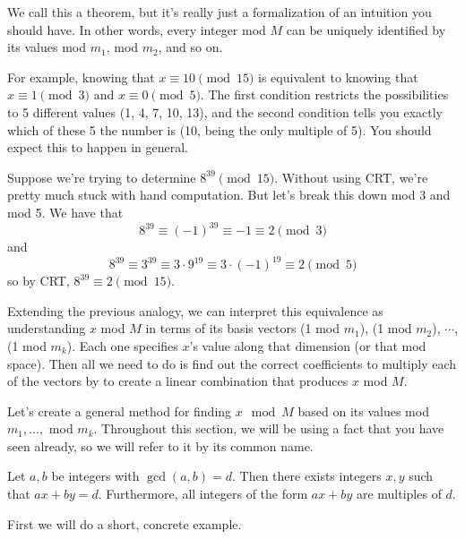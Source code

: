 \documentclass[11 pt]{scrartcl}
\begin{document}
We call this a theorem, but it's really just a formalization of an intuition you should have. In other words, every integer mod $M$ can be uniquely identified by its values mod $m_1$, mod $m_2$, and so on. 

For example, knowing that $x\equiv 10 \pmod{15}$ is equivalent to knowing that $x\equiv 1\pmod{3}$ and $x \equiv 0 \pmod{5}$. The first condition restricts the possibilities to 5 different values (1, 4, 7, 10, 13), and the second condition tells you exactly which of these 5 the number is (10, being the only multiple of 5). You should expect this to happen in general.

\begin{example}
    Suppose we're trying to determine $8^{39} \pmod{15}$. Without using CRT, we're pretty much stuck with hand computation. But let's break this down mod 3 and mod 5. We have that 
    \[ 8^{39} \equiv (-1)^{39} \equiv -1 \equiv 2 \pmod{3} \] 
    and 
    \[ 8^{39} \equiv 3^{39} \equiv 3\cdot 9^{19} \equiv 3\cdot (-1)^{19} \equiv 2\pmod{5} \] 
    so by CRT, $8^{39}\equiv 2 \pmod{15}$. 
\end{example}

Extending the previous analogy, we can interpret this equivalence as understanding $x$ mod $M$ in terms of its basis vectors (1 mod $m_1$), (1 mod $m_2$), $\cdots$, (1 mod $m_k$). Each one specifies $x$'s value along that dimension (or that mod space). Then all we need to do is find out the correct coefficients to multiply each of the vectors by to create a linear combination that produces $x$ mod $M$. 

Let's create a general method for finding $x\mod{M}$ based on its values mod $m_1, \dots,$ mod $m_k$. Throughout this section, we will be using a fact that you have seen already, so we will refer to it by its common name. 

\begin{theorem}
    Let $a,b$ be integers with $\gcd(a,b) = d$. Then there exists integers $x,y$ such that $ax+by = d$. Furthermore, all integers of the form $ax+by$ are multiples of $d$. 
\end{theorem}

First we will do a short, concrete example. 
\end{document}
